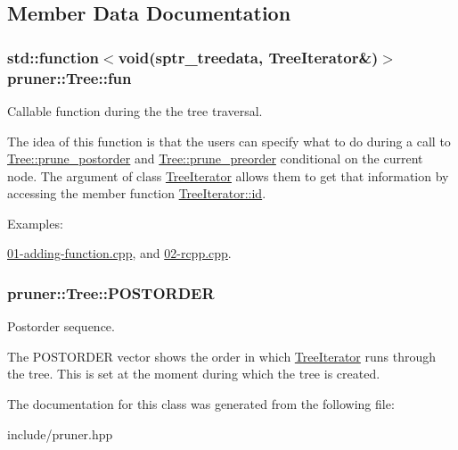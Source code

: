 \subsection{Member Data Documentation}
\subsubsection[{\texorpdfstring{fun}{fun}}]{\setlength{\rightskip}{0pt plus 5cm}std\+::function$<$void({\bf sptr\+\_\+treedata}, {\bf Tree\+Iterator}\&)$>$ pruner\+::\+Tree\+::fun}\hypertarget{classpruner_1_1Tree_a095f59358c914fb66939d2d82ca3ebc4}{}\label{classpruner_1_1Tree_a095f59358c914fb66939d2d82ca3ebc4}


Callable function during the the tree traversal. 

The idea of this function is that the users can specify what to do during a call to \hyperlink{classpruner_1_1Tree_a7d465880d18acf79f3a772ea5412b0d7}{Tree\+::prune\+\_\+postorder} and \hyperlink{classpruner_1_1Tree_ac85bfb083b3856e65987e1d15885a61c}{Tree\+::prune\+\_\+preorder} conditional on the current node. The argument of class \hyperlink{classpruner_1_1TreeIterator}{Tree\+Iterator} allows them to get that information by accessing the member function \hyperlink{classpruner_1_1TreeIterator_ae76ec4f2c1390d72889f78a51d65d19c}{Tree\+Iterator\+::id}. \begin{Desc}
\item[Examples\+: ]\par
\hyperlink{01-adding-function_8cpp-example}{01-\/adding-\/function.\+cpp}, and \hyperlink{02-rcpp_8cpp-example}{02-\/rcpp.\+cpp}.\end{Desc}
\subsubsection[{\texorpdfstring{P\+O\+S\+T\+O\+R\+D\+ER}{POSTORDER}}]{ pruner\+::\+Tree\+::\+P\+O\+S\+T\+O\+R\+D\+ER\hspace{0.3cm}{\ttfamily [protected]}}\hypertarget{classpruner_1_1Tree_a547937e845fdbceafae4db25cd74f880}{}\label{classpruner_1_1Tree_a547937e845fdbceafae4db25cd74f880}


Postorder sequence. 

The P\+O\+S\+T\+O\+R\+D\+ER vector shows the order in which \hyperlink{classpruner_1_1TreeIterator}{Tree\+Iterator} runs through the tree. This is set at the moment during which the tree is created. 

The documentation for this class was generated from the following file\+:\begin{DoxyCompactItemize}
\item 
include/pruner.\+hpp\end{DoxyCompactItemize}
